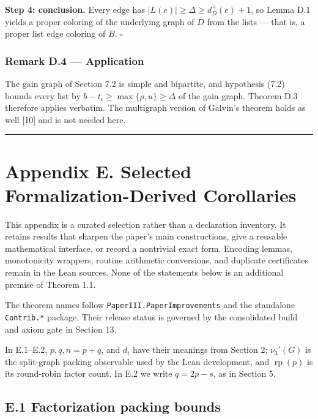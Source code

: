 \documentclass[
  american,
  11pt,
  a4paper,
]{article}
\begin{document}
\textbf{Step 4: conclusion.} Every edge has \(|L(e)|\ge\Delta\ge d^+_D(e)+1\), so Lemma D.1 yields a proper coloring of the underlying graph of \(D\) from the lists --- that is, a proper list edge coloring of \(B\). \(\square\)

\subsubsection{Remark D.4 --- Application}\label{remark-d.4-application}

The gain graph of Section 7.2 is simple and bipartite, and hypothesis (7.2) bounds every list by \(b-t_i\ge\max\{\rho,u\}\ge\Delta\) of the gain graph. Theorem D.3 therefore applies verbatim. The multigraph version of Galvin's theorem holds as well {[}10{]} and is not needed here.

\begin{center}\rule{0.5\linewidth}{0.5pt}\end{center}

\section{Appendix E. Selected Formalization-Derived Corollaries}\label{appendix-e.-selected-formalization-derived-corollaries}

This appendix is a curated selection rather than a declaration inventory. It retains results that sharpen the paper's main constructions, give a reusable mathematical interface, or record a nontrivial exact form. Encoding lemmas, monotonicity wrappers, routine arithmetic conversions, and duplicate certificates remain in the Lean sources. None of the statements below is an additional premise of Theorem 1.1.

The theorem names follow \texttt{PaperIII.PaperImprovements} and the standalone \texttt{Contrib.*} package. Their release status is governed by the consolidated build and axiom gate in Section 13.

In E.1--E.2, \(p,q,n=p+q\), and \(d_i\) have their meanings from Section 2; \(\nu_3'(G)\) is the split-graph packing observable used by the Lean development, and \(\operatorname{rp}(p)\) is its round-robin factor count. In E.2 we write \(q=2p-s\), as in Section 5.

\subsection{E.1 Factorization packing bounds}\label{e.1-factorization-packing-bounds}
\end{document}

